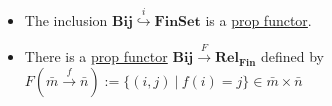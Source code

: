\begin{itemize}
    \item The inclusion $\mathbf{Bij} \overset{i}{\hookrightarrow} \mathbf{FinSet}$ is a \href{doc/1 math/Seven Sketches in Compositionality/Chapter 5: Signal flow graphs/2 Props and presentations/1 Props - definition and first examples/2 Prop functor}{prop functor}.
    \item There is a \href{doc/1 math/Seven Sketches in Compositionality/Chapter 5: Signal flow graphs/2 Props and presentations/1 Props - definition and first examples/2 Prop functor}{prop functor} $\mathbf{Bij} \xrightarrow F \mathbf{Rel_{Fin}}$ defined by $F(\bar{m} \xrightarrow{f} \bar{n}):=\{(i,j)\ |\ f(i)=j\} \in \bar m \times \bar n$
  \end{itemize}